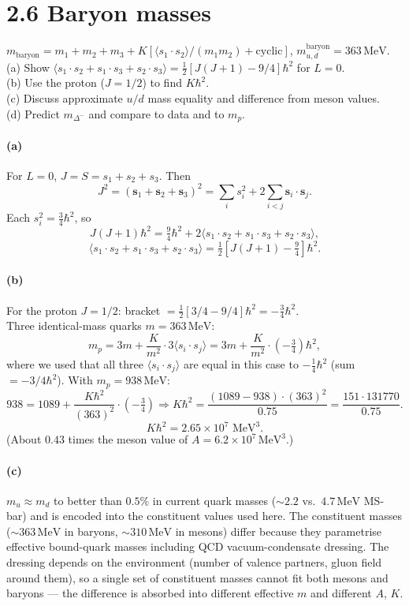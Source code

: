 \documentclass[11pt]{article}
\newcommand{\Q}[1]{\begin{question}#1\end{question}}
\newcommand{\MeV}{\,\mathrm{MeV}}
\begin{document}
\section*{2.6 \quad Baryon masses}

\Q{$m_\mathrm{baryon}=m_1+m_2+m_3+K[\langle s_1\cdot s_2\rangle/(m_1m_2)+\text{cyclic}]$, $m_{u,d}^\mathrm{baryon}=363\MeV$.\\
(a) Show $\langle s_1\cdot s_2+s_1\cdot s_3+s_2\cdot s_3\rangle=\tfrac12[J(J+1)-9/4]\hbar^{2}$ for $L=0$.\\
(b) Use the proton ($J=1/2$) to find $K\hbar^{2}$.\\
(c) Discuss approximate $u/d$ mass equality and difference from meson values.\\
(d) Predict $m_{\Delta^-}$ and compare to data and to $m_p$.}

\paragraph{(a)} For $L=0$, $J=S=s_1+s_2+s_3$. Then
\[
J^{2}=(\mathbf{s}_1+\mathbf{s}_2+\mathbf{s}_3)^{2}=\sum_i s_i^{2}+2\sum_{i<j}\mathbf{s}_i\cdot\mathbf{s}_j.
\]
Each $s_i^{2}=\tfrac34\hbar^{2}$, so
\[
J(J+1)\hbar^{2}= \tfrac{9}{4}\hbar^{2}+2\langle s_1\!\cdot\! s_2+s_1\!\cdot\! s_3+s_2\!\cdot\! s_3\rangle,
\]
\[
\boxed{\;\langle s_1\!\cdot\! s_2+s_1\!\cdot\! s_3+s_2\!\cdot\! s_3\rangle=\tfrac12\!\left[J(J+1)-\tfrac{9}{4}\right]\hbar^{2}.\;}
\]

\paragraph{(b)} For the proton $J=1/2$: bracket $=\tfrac12[3/4-9/4]\hbar^{2}=-\tfrac{3}{4}\hbar^{2}$.\\
Three identical-mass quarks $m=363\MeV$:
\[
m_p=3m+\frac{K}{m^{2}}\cdot 3\langle s_i\!\cdot\! s_j\rangle = 3m+\frac{K}{m^{2}}\!\cdot\!(-\tfrac34)\hbar^{2},
\]
where we used that all three $\langle s_i\cdot s_j\rangle$ are equal in this case to $-\tfrac14\hbar^{2}$ (sum $=-3/4\hbar^{2}$). With $m_p=938\MeV$:
\[
938 = 1089 + \frac{K\hbar^{2}}{(363)^{2}}\cdot(-\tfrac34)\Rightarrow K\hbar^{2}=\frac{(1089-938)\cdot (363)^{2}}{0.75}=\frac{151\cdot 131770}{0.75}.
\]
\[
\boxed{\;K\hbar^{2}=2.65\times 10^{7}\,\MeV^{3}.\;}
\]
(About $0.43$ times the meson value of $A=6.2\times 10^{7}\MeV^{3}$.)

\paragraph{(c)} $m_u\approx m_d$ to better than $0.5\%$ in current quark masses ($\sim 2.2$ vs.\ $4.7\MeV$ MS-bar) and is encoded into the constituent values used here. The constituent masses ($\sim 363\MeV$ in baryons, $\sim 310\MeV$ in mesons) differ because they parametrise effective bound-quark masses including QCD vacuum-condensate dressing. The dressing depends on the environment (number of valence partners, gluon field around them), so a single set of constituent masses cannot fit both mesons and baryons --- the difference is absorbed into different effective $m$ and different $A$, $K$.
\end{document}
